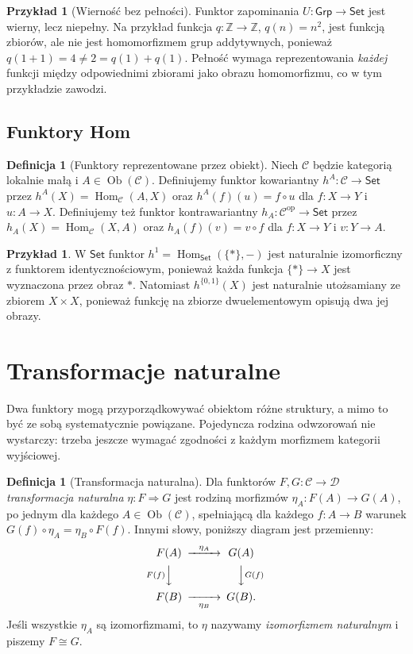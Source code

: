 \documentclass[11pt,a4paper]{article}
\numberwithin{equation}{section}
\theoremstyle{plain}
\theoremstyle{definition}
\newtheorem{definicja}[twierdzenie]{Definicja}
\newtheorem{przyklad}[twierdzenie]{Przykład}
\theoremstyle{remark}
\newcommand{\cat}[1]{\mathsf{#1}}
\newcommand{\Set}{\cat{Set}}
\newcommand{\Grp}{\cat{Grp}}
\newcommand{\Hom}{\operatorname{Hom}}
\newcommand{\Ob}{\operatorname{Ob}}
\newcommand{\op}{\mathrm{op}}
\begin{document}
\begin{przyklad}[Wierność bez pełności]
Funktor zapominania $U:\Grp\to\Set$ jest wierny, lecz niepełny. Na przykład funkcja $q:\mathbb Z\to\mathbb Z$, $q(n)=n^2$, jest funkcją zbiorów, ale nie jest homomorfizmem grup addytywnych, ponieważ $q(1+1)=4\neq 2=q(1)+q(1)$. Pełność wymaga reprezentowania \emph{każdej} funkcji między odpowiednimi zbiorami jako obrazu homomorfizmu, co w tym przykładzie zawodzi.
\end{przyklad}


\subsection{Funktory Hom}

\begin{definicja}[Funktory reprezentowane przez obiekt]\label{def:hom-funktory}
Niech $\mathcal C$ będzie kategorią lokalnie małą i $A\in\Ob(\mathcal C)$. Definiujemy funktor kowariantny $h^A:\mathcal C\to\Set$ przez $h^A(X)=\Hom_{\mathcal C}(A,X)$ oraz $h^A(f)(u)=f\circ u$ dla $f:X\to Y$ i $u:A\to X$. Definiujemy też funktor kontrawariantny $h_A:\mathcal C^{\op}\to\Set$ przez $h_A(X)=\Hom_{\mathcal C}(X,A)$ oraz $h_A(f)(v)=v\circ f$ dla $f:X\to Y$ i $v:Y\to A$.
\end{definicja}

\begin{przyklad}
W $\Set$ funktor $h^1=\Hom_{\Set}(\{*\},-)$ jest naturalnie izomorficzny z funktorem identycznościowym, ponieważ każda funkcja $\{*\}\to X$ jest wyznaczona przez obraz $*$. Natomiast $h^{\{0,1\}}(X)$ jest naturalnie utożsamiany ze zbiorem $X\times X$, ponieważ funkcję na zbiorze dwuelementowym opisują dwa jej obrazy.
\end{przyklad}

\section{Transformacje naturalne}\label{sec:naturalne}

Dwa funktory mogą przyporządkowywać obiektom różne struktury, a mimo to być ze sobą systematycznie powiązane. Pojedyncza rodzina odwzorowań nie wystarczy: trzeba jeszcze wymagać zgodności z każdym morfizmem kategorii wyjściowej.

\begin{definicja}[Transformacja naturalna]\label{def:naturalna}
Dla funktorów $F,G:\mathcal C\to\mathcal D$ \emph{transformacja naturalna} $\eta:F\Rightarrow G$ jest rodziną morfizmów $\eta_A:F(A)\to G(A)$, po jednym dla każdego $A\in\Ob(\mathcal C)$, spełniającą dla każdego $f:A\to B$ warunek $G(f)\circ\eta_A=\eta_B\circ F(f)$. Innymi słowy, poniższy diagram jest przemienny:
\[
\begin{CD}
F(A) @>{\eta_A}>> G(A)\\
@V{F(f)}VV @VV{G(f)}V\\
F(B) @>>{\eta_B}> G(B).
\end{CD}
\]
Jeśli wszystkie $\eta_A$ są izomorfizmami, to $\eta$ nazywamy \emph{izomorfizmem naturalnym} i piszemy $F\cong G$.
\end{definicja}
\end{document}

